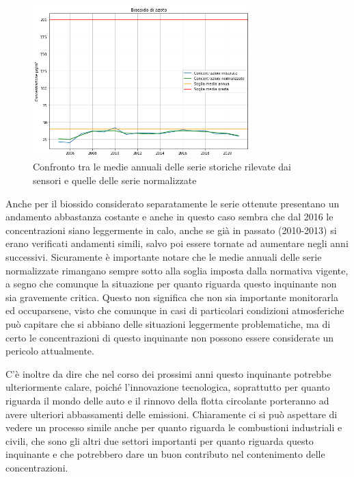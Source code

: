 \documentclass[a4paper]{report}
\begin{document}
\begin{figure}[h]
\centering
\includegraphics[width=0.75\textwidth]{no2_medie_annuali}
\caption{Confronto tra le medie annuali delle serie storiche rilevate dai sensori e quelle delle serie normalizzate}
\label{fig:no2_medie_annuali}
\end{figure}

Anche per il biossido considerato separatamente le serie ottenute presentano un andamento abbastanza costante e anche in questo caso sembra che dal 2016 le concentrazioni siano leggermente in calo, anche se già in passato (2010-2013) si erano verificati andamenti simili, salvo poi essere tornate ad aumentare negli anni successivi.
Sicuramente è importante notare che le medie annuali delle serie normalizzate rimangano sempre sotto alla soglia imposta dalla normativa vigente, a segno che comunque la situazione per quanto riguarda questo inquinante non sia gravemente critica. Questo non significa che non sia importante monitorarla ed occuparsene, visto che comunque in casi di particolari condizioni atmosferiche può capitare che si abbiano delle situazioni leggermente problematiche, ma di certo le concentrazioni di questo inquinante non possono essere considerate un pericolo attualmente.

C'è inoltre da dire che nel corso dei prossimi anni questo inquinante potrebbe ulteriormente calare, poiché l'innovazione tecnologica, soprattutto per quanto riguarda il mondo delle auto e il rinnovo della flotta circolante porteranno ad avere ulteriori abbassamenti delle emissioni. Chiaramente ci si può aspettare di vedere un processo simile anche per quanto riguarda le combustioni industriali e civili, che sono gli altri due settori importanti per quanto riguarda questo inquinante e che potrebbero dare un buon contributo nel contenimento delle concentrazioni.
\end{document}
